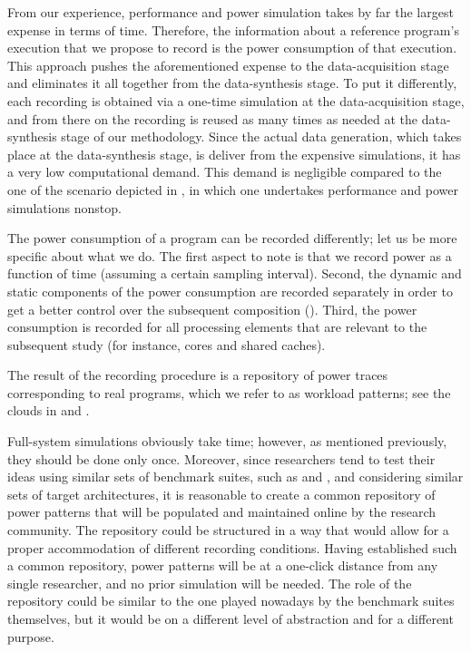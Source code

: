 From our experience, performance and power simulation takes by far the largest
expense in terms of time. Therefore, the information about a reference program's
execution that we propose to record is the power consumption of that execution.
This approach pushes the aforementioned expense to the data-acquisition stage
and eliminates it all together from the data-synthesis stage. To put it
differently, each recording is obtained via a one-time simulation at the
data-acquisition stage, and from there on the recording is reused as many times
as needed at the data-synthesis stage of our methodology. Since the actual data
generation, which takes place at the data-synthesis stage, is deliver from the
expensive simulations, it has a very low computational demand. This demand is
negligible compared to the one of the scenario depicted in ,
in which one undertakes performance and power simulations nonstop.

The power consumption of a program can be recorded differently; let us be more
specific about what we do. The first aspect to note is that we record power as a
function of time (assuming a certain sampling interval). Second, the dynamic and
static components of the power consumption are recorded separately in order to
get a better control over the subsequent composition ().
Third, the power consumption is recorded for all processing elements that are
relevant to the subsequent study (for instance, cores and shared caches).

The result of the recording procedure is a repository of power traces
corresponding to real programs, which we refer to as workload patterns; see the
clouds in  and .

Full-system simulations obviously take time; however, as mentioned previously,
they should be done only once. Moreover, since researchers tend to test their
ideas using similar sets of benchmark suites, such as 
\cite{bienia2011} and  \cite{cpu2006}, and considering similar
sets of target architectures, it is reasonable to create a common repository of
power patterns that will be populated and maintained online by the research
community. The repository could be structured in a way that would allow for a
proper accommodation of different recording conditions. Having established such
a common repository, power patterns will be at a one-click distance from any
single researcher, and no prior simulation will be needed. The role of the
repository could be similar to the one played nowadays by the benchmark suites
themselves, but it would be on a different level of abstraction and for a
different purpose.


